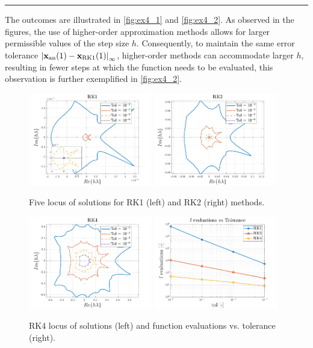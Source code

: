 \documentclass[11pt,a4paper,oneside]{article}
\renewcommand{\vec}[1]{\mathbf{#1}}
\begin{document}
\medskip \hrule \medskip

The outcomes are illustrated in \autoref{fig:ex4_1} and \autoref{fig:ex4_2}. As observed in the figures, 
the use of higher-order approximation methods allows for larger permissible values of the step size $h$. 
Consequently, to maintain the same error tolerance $\left|\vec x_{\rm an}(1)-\vec x_{\rm RK1}(1)\right|_\infty$, 
higher-order methods can accommodate larger $h$, resulting in fewer steps at which the function needs 
to be evaluated, this observation is further exemplified in \autoref{fig:ex4_2}.
\begin{figure}[h]
\includegraphics[width=0.48\textwidth]{gfx/ex4_1.pdf}
    \includegraphics[width=0.48\textwidth]{gfx/ex4_2.pdf}
    \caption{Five locus of solutions for RK1 (left) and RK2 (right) methods.}
    \label{fig:ex4_1}
\end{figure}
\begin{figure}[h]
    \centering
    \includegraphics[width=0.48\textwidth]{gfx/ex4_3.pdf}
    \includegraphics[width=0.48\textwidth]{gfx/ex4_4.pdf}
    \caption{RK4 locus of solutions (left) and function evaluations vs. tolerance (right).}
    \label{fig:ex4_2}
\end{figure}
\end{document}
